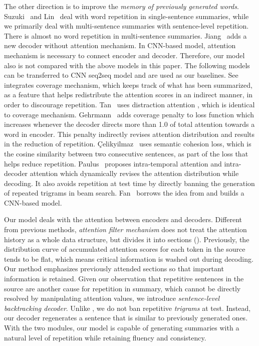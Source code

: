 The other direction is to improve the 
{\em memory of previously generated words}.
Suzuki~ and Lin~ 
deal with word repetition in single-sentence summaries, 
while we primarily deal with multi-sentence summaries with 
sentence-level repetition. 
There is almost no word repetition in multi-sentence summaries.
Jiang~ adds a new decoder without attention mechanism.
In CNN-based model, attention mechanism is necessary to connect encoder 
and decoder.
Therefore, our model also is not compared with the above models in this paper. 
The following models can be transferred to CNN seq2seq model and
are used as our baselines.
See~ integrates coverage mechanism, 
which keeps track of what has been summarized, as a feature that helps 
redistribute the attention scores in an indirect manner,
in order to discourage repetition. 
Tan~ uses distraction attention
\cite{ChenZLWJ16}, which is identical to coverage mechanism. 
Gehrmann~ adds coverage penalty to loss function
which increases whenever the decoder directs more than 1.0 of total attention
towards a word in encoder.
This penalty indirectly revises attention distribution and results in
the reduction of repetition.
{\c{C}}elikyilmaz~ uses semantic cohesion loss,
which is the cosine similarity between two consecutive sentences, as part of
the loss that helps reduce repetition.
Paulus~ proposes intra-temporal attention \cite{NallapatiZSGX16} and 
intra-decoder attention which dynamically revises the attention distribution while decoding. 
It also avoids repetition at test time by directly banning the generation of 
repeated trigrams in beam search. 
Fan~ borrows the idea from \cite{PaulusXS17} and 
builds a CNN-based model. 

Our model deals with the attention between encoders and decoders. 
Different from previous methods, 
\textit{attention filter mechanism} does not 
treat the attention history as a whole data structure,  
but divides it into sections (). 
Previously, the distribution curve of accumulated attention scores 
for each token in the source tends to be flat, 
which means critical information is washed out during decoding.
Our method emphasizes previously attended sections 
so that important information is retained.
Given our observation that repetitive sentences in the source are
another cause for repetition in summary, 
which cannot be directly resolved by manipulating attention values, 
we introduce \textit{sentence-level backtracking decoder}. 
Unlike \cite{PaulusXS17}, 
we do not ban repetitive \textit{trigrams} at test. 
Instead, our decoder regenerates a sentence that is similar to previously generated ones.
With the two modules, our model is capable of generating summaries with a
natural level of repetition while retaining fluency and consistency.

